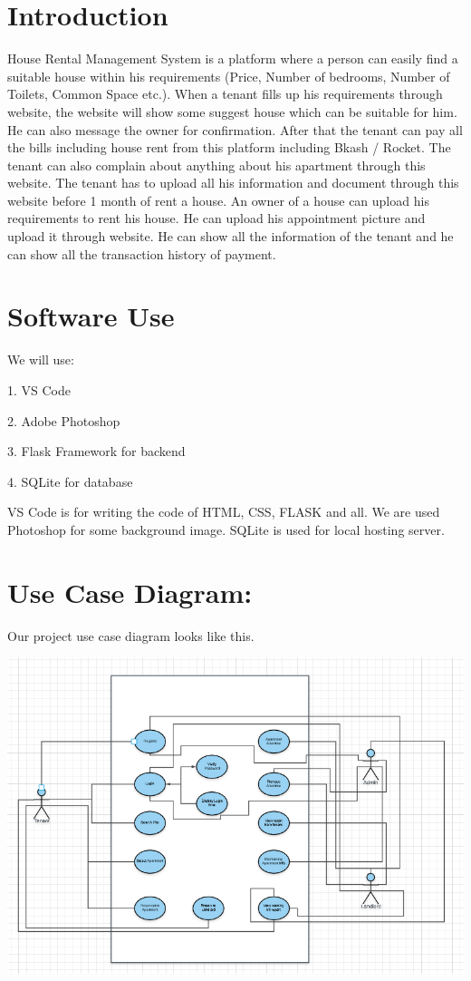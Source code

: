 \documentclass{article}
\begin{document}
\section{Introduction}

House Rental Management System is a platform where a person can easily find a suitable house within his requirements (Price, Number of bedrooms, Number of Toilets, Common Space etc.). When a tenant fills up his requirements through website, the website will show some suggest house which can be suitable for him. He can also message the owner for confirmation. After that the tenant can pay all the bills including house rent from this platform including Bkash / Rocket. The tenant can also complain about anything about his apartment through this website. The tenant has to upload all his information and document through this website before 1 month of rent a house. An owner of a house can upload his requirements to rent his house. He can upload his appointment picture and upload it through website. He can show all the information of the tenant and he can show all the transaction history of payment.

\vspace{3cm}


\section{Software Use}

We will use: 

1.	VS Code

2.	Adobe Photoshop

3.	Flask Framework for backend 

4.	SQLite for database 

VS Code is for writing the code of HTML, CSS, FLASK and all. We are used Photoshop for some background image. SQLite is used for local hosting server. 
\vspace{5cm}
\section{Use Case Diagram:}

Our project use case diagram looks like this.
\begin{center}
    \includegraphics[width=\linewidth]{flow_chart.png}
\end{center}
\end{document}
